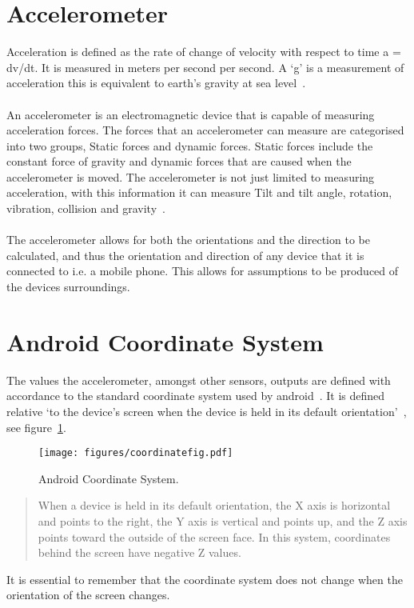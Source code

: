 \section{Accelerometer} %
\label{sec:section_accelerometer}
Acceleration is defined as the rate of change of velocity with respect to time a = dv/dt. It is measured in meters per second per second. A `g' is a measurement of acceleration this is equivalent to earth’s gravity at sea level~\cite{tiacc}.
\paragraph{}
An accelerometer is an electromagnetic device that is capable of measuring acceleration forces. The forces that an accelerometer can measure are categorised into two groups, Static forces and dynamic forces. Static forces include the constant force of gravity and dynamic forces that are caused when the accelerometer is moved. The accelerometer is not just limited to measuring acceleration, with this information it can measure Tilt and tilt angle, rotation, vibration, collision and gravity~\cite{lindsay2005parallax}.
\paragraph{} %
The accelerometer allows for both the orientations and the direction to be calculated, and thus the orientation and direction of any device that it is connected to i.e. a mobile phone.  This allows for assumptions to be produced of the devices surroundings.


\section{Android Coordinate System}
\label{sec:coordinate}
The values the accelerometer, amongst other sensors, outputs are defined with accordance to the standard coordinate system used by android~\cite{android2013coordinate}. It is defined relative `to the device's screen when the device is held in its default orientation'~\cite{android2013coordinate}, see figure~\ref{fig:Figures_coordinate}.
\begin{figure}[h]
  \texttt{[image: figures/coordinatefig.pdf]}
  \caption{Android Coordinate System.}
  \label{fig:Figures_coordinate}
\end{figure} 
\begin{quote}
When a device is held in its default orientation, the X axis is horizontal and points to the right, the Y axis is vertical and points up, and the Z axis points toward the outside of the screen face. In this system, coordinates behind the screen have negative Z values.
\end{quote}
It is essential to remember that the coordinate system does not change when the orientation of the screen changes.

